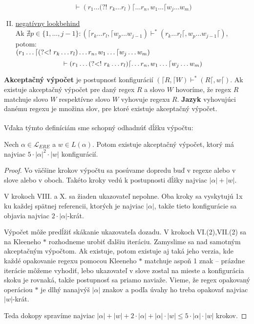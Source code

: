 \documentclass{svk_long_sk}
\def\el{\mathscr{L}_{ERE}}
\def\nlookahead{\text{(?!~}}
\def\nlookbehind{\text{(?\textless !~}}
\begin{document}
\begin{definition}
\begin{enumerate}[I.]
$$\vdash (r_1\dots \nlookahead r_{k}\dots r_{l} ) \lceil\dots r_n, w_1\dots \lceil w_j \dots w_m)$$
\item \underline{negatívny lookbehind}
\\ Ak $\nexists p \in \lbrace 1,\dots,j-1\rbrace: (\lceil r_k\dots r_l,\lceil w_p\dots w_{j-1}) \vdash^* (r_k\dots r_l\lceil, w_p \dots w_{j-1} \lceil)$, potom:
\\$\displaystyle{(r_1\dots\lceil \nlookbehind r_{k}\dots r_{l} ) \dots r_n, w_1\dots \lceil w_j \dots w_m)}$
$$\vdash (r_1\dots \nlookbehind r_{k}\dots r_{l} ) \lceil\dots r_n, w_1\dots \lceil w_j \dots w_m)$$
\end{enumerate}
\end{definition}

\textbf{Akceptačný výpočet} je postupnosť konfigurácií $(\lceil R, \lceil W) \vdash^* (R\lceil,w\lceil)$. Ak existuje akceptačný výpočet pre daný regex $R$ a slovo $W$ hovoríme, že regex $R$ matchuje slovo $W$ respektívne slovo $W$ vyhovuje regexu $R$. \textbf{Jazyk} vyhovujúci danému regexu je množina slov, pre ktoré existuje akceptačný výpočet.
\\ \\ Vďaka týmto definíciám sme schopný odhadnúť dĺžku výpočtu:
\begin{lemma}
Nech $\alpha \in \el$ a $w \in L(\alpha)$. Potom existuje akceptačný výpočet, ktorý má najviac $5\cdot|\alpha|^2\cdot|w|$ konfigurácií.
\end{lemma}
\begin{proof}
Vo väčšine krokov výpočtu sa posúvame dopredu buď v regexe alebo v slove alebo v oboch. Takéto kroky vedú k postupnosti dĺžky najviac $|\alpha|+|w|$.

V krokoch VIII. a X. sa žiaden ukazovateľ nepohne. Oba kroky sa vyskytujú 1x ku každej spätnej referencii, ktorých je najviac $|\alpha|$, takže tieto konfigurácie sa objavia najviac $2\cdot|\alpha|$-krát.

Výpočet môže predĺžiť skákanie ukazovateľa dozadu. V krokoch VI.(2),VII.(2) sa na Kleeneho $*$ rozhodneme urobiť ďalšiu iteráciu. Zamyslime sa nad samotným akceptačným výpočtom. Ak existuje, potom existuje aj taká jeho verzia, kde každé opakovanie regexu pomocou Kleeneho $*$ matchuje aspoň 1 znak -- prázdne iterácie môžeme vyhodiť, lebo ukazovateľ v slove zostal na mieste a konfigurácia skoku je rovnaká, takže postupnosť sa priamo naviaže. Vieme, že regex opakovaný operáciou $*$ je dlhý nanajvýš $|\alpha|$ znakov a podľa úvahy ho treba opakovať najviac $|w|$-krát.

Teda dokopy spravíme najviac $|\alpha|+|w|+2\cdot|\alpha|+|\alpha|\cdot|w| \leq 5\cdot|\alpha|\cdot|w|$ krokov.
\end{proof}
\end{document}
